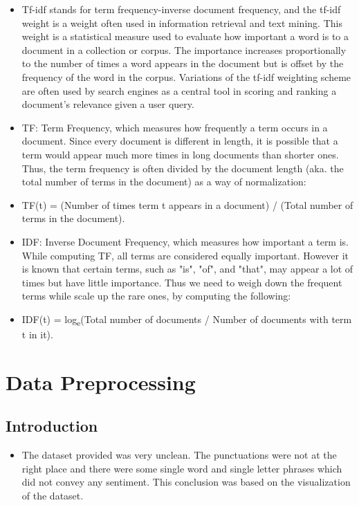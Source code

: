 \documentclass[12pt]{article}
\begin{document}
\begin{itemize}
\item Tf-idf stands for term frequency-inverse document frequency, and the tf-idf weight is a weight often used in information retrieval and text mining. This weight is a statistical measure used to evaluate how important a word is to a document in a collection or corpus. The importance increases proportionally to the number of times a word appears in the document but is offset by the frequency of the word in the corpus. Variations of the tf-idf weighting scheme are often used by search engines as a central tool in scoring and ranking a document's relevance given a user query.




    \item TF: Term Frequency, which measures how frequently a term occurs in a document. Since every document is different in length, it is possible that a term would appear much more times in long documents than shorter ones. Thus, the term frequency is often divided by the document length (aka. the total number of terms in the document) as a way of normalization:

    \item TF(t) = (Number of times term t appears in a document) / (Total number of terms in the document).

    \item IDF: Inverse Document Frequency, which measures how important a term is. While computing TF, all terms are considered equally important. However it is known that certain terms, such as "is", "of", and "that", may appear a lot of times but have little importance. Thus we need to weigh down the frequent terms while scale up the rare ones, by computing the following:

    \item IDF(t) = log\textsubscript{e}(Total number of documents / Number of documents with term t in it).
    \end{itemize}

\section{Data Preprocessing}

\subsection{Introduction}
\begin{itemize}
    \item The dataset provided was very unclean. The punctuations were not at the right place and there were some single word and single letter phrases which did not convey any sentiment. This conclusion was based on the visualization of the dataset.
    \end{itemize}
    
\end{document}
